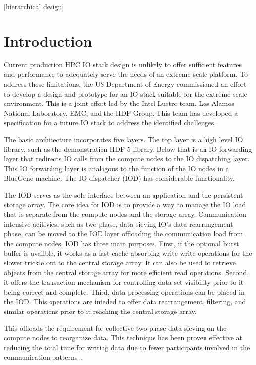 \documentclass[conference]{sig-alt-gov2}
\begin{document}
[hierarchical design]


\section{Introduction}

Current production HPC IO stack design is unlikely to offer sufficient features
and performance to adequately serve the needs of an extreme scale platform. To
address these limitations, the US Department of Energy commissioned an effort
to develop a design and prototype for an IO stack suitable for the extreme
scale environment. This is a joint effort led by the Intel Lustre team, Los
Alamos National Laboratory, EMC, and the HDF Group. This team has developed a
specification for a future IO stack to address the identified challenges.

The basic architecture incorporates five layers. The top layer is a high level
IO library, such as the demonstration HDF-5 library. Below that is an IO
forwarding layer that redirects IO calls from the compute nodes to the IO
dispatching layer. This IO forwarding layer is analogous to the function of the
IO nodes in a BlueGene machine. The IO dispatcher (IOD) has considerable
functionality.

The IOD serves as the sole interface between an application and the persistent
storage array. The core idea for IOD is to provide a way to manage the IO load
that is separate from the compute nodes and the storage array. Communication
intensive acitivies, such as two-phase, data sieving IO's data rearrangement
phase, can be moved to the IOD layer offloading the communication load from the
compute nodes. IOD has three main purposes. First, if the optional burst
buffer is availble, it works as a fast cache absorbing write write operations
for the slower trickle out to the central storage array. It can also be used to
retrieve objects from the central storage array for more efficient read
operations. Second, it offers the transaction mechanism for controlling data
set visibility prior to it being correct and complete. Third, data processing
operations can be placed in the IOD. This operations are inteded to offer data
rearrangement, filtering, and similar operations prior to it reaching the
central storage array.

This offloads the requirement for collective two-phase data sieving
on the compute nodes to reorganize data. This technique has been proven
effective at reducing the total time for writing data due to fewer participants
involved in the communication patterns~\cite{lofstead:2011:nessie-staging}.
\end{document}
